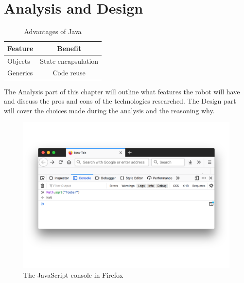 \chapter{Analysis and Design}
\label{chap:analysis-and-design}

\bigskip

\begin{table}[tb] %
  \centering
  \begin{tabular}{l c}  %
    Feature  & Benefit
    \\\hline
    Objects  & State encapsulation
    \\
    Generics & Code reuse
  \end{tabular}
  \caption{Advantages of Java}
  \label{tab:java-advantages}
\end{table}

\bigskip

\noindent
The Analysis part of this chapter will outline what features the robot will have and discuss the 
pros and cons of the technologies researched. 
The Design part will cover the choices made during the analysis and the reasoning why.

\bigskip


\begin{figure}[tb] %
  \centering
  \includegraphics[width=.9\linewidth]{assets/firefox-js-console}
  \caption{The JavaScript console in Firefox }
  \label{fig:firefox-js-console}
\end{figure}
